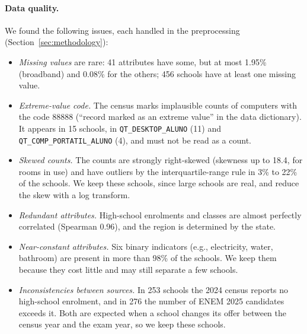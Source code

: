 \paragraph{Data quality.} We found the following issues, each handled in the preprocessing
(Section~\ref{sec:methodology}):
\begin{itemize}
  \item \emph{Missing values} are rare: 41 attributes have some, but at most 1.95\%
        (broadband) and 0.08\% for the others; 456 schools have at least one missing value.
  \item \emph{Extreme-value code.} The census marks implausible counts of computers with the code
        88888 (``record marked as an extreme value'' in the data dictionary). It appears in 15
        schools, in \texttt{QT\_DESKTOP\_ALUNO} (11) and \texttt{QT\_COMP\_PORTATIL\_ALUNO} (4), and
        must not be read as a count.
  \item \emph{Skewed counts.} The counts are strongly right-skewed (skewness up to 18.4, for rooms
        in use) and have outliers by the interquartile-range rule in 3\% to 22\% of the schools.
        We keep these schools, since large schools are real, and reduce the skew with a log
        transform.
  \item \emph{Redundant attributes.} High-school enrolments and classes are almost perfectly
        correlated (Spearman 0.96), and the region is determined by the state.
  \item \emph{Near-constant attributes.} Six binary indicators (e.g., electricity, water,
        bathroom) are present in more than 98\% of the schools. We keep them because they cost
        little and may still separate a few schools.
  \item \emph{Inconsistencies between sources.} In 253 schools the 2024 census reports no
        high-school enrolment, and in 276 the number of ENEM 2025 candidates exceeds it. Both are
        expected when a school changes its offer between the census year and the exam year, so we
        keep these schools.
\end{itemize}
